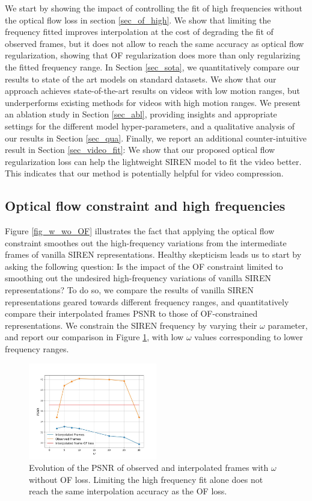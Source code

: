 \documentclass{article}
\begin{document}
We start by showing the impact of controlling the fit of high frequencies without the optical flow loss in section \ref{sec_of_high}.
We show that limiting the frequency fitted improves interpolation at the cost of degrading the fit of observed frames,
but it does not allow to reach the same accuracy as optical flow regularization,
showing that OF regularization does more than only regularizing the fitted frequency range.
In Section \ref{sec_sota}, we quantitatively compare our results to state of the art models on standard datasets.
We show that our approach achieves state-of-the-art results on videos with low motion ranges,
but underperforms existing methods for videos with high motion ranges.
We present an ablation study in Section \ref{sec_abl},
providing insights and appropriate settings for the different model hyper-parameters,
and a qualitative analysis of our results in Section \ref{sec_qua}.
Finally, we report an additional counter-intuitive result in Section \ref{sec_video_fit}:
We show that our proposed optical flow regularization loss can help the lightweight SIREN model to fit the video better.
This indicates that our method is potentially helpful for video compression.

\subsection{Optical flow constraint and high frequencies}

Figure \ref{fig_w_wo_OF} illustrates the fact that applying the optical flow constraint smoothes
out the high-frequency variations from the intermediate frames of vanilla SIREN representations.
Healthy skepticism leads us to start by asking the following question:
Is the impact of the OF constraint limited to smoothing out the undesired high-frequency variations of vanilla SIREN representations?
To do so, we compare the results of vanilla SIREN representations geared towards different frequency ranges,
and quantitatively compare their interpolated frames PSNR to those of OF-constrained representations.
We constrain the SIREN frequency by varying their $\omega$ parameter, and report our comparison in Figure \ref{fig_omega},
with low $\omega$ values corresponding to lower frequency ranges.

\begin{figure}[t]
\centering
\includegraphics[width=0.5\textwidth]{"omega_wo_of"}
\caption{Evolution of the PSNR of observed and interpolated frames with $\omega$ without OF loss.
Limiting the high frequency fit alone does not reach the same interpolation accuracy as the OF loss.}
\label{fig_omega}
\end{figure}
\end{document}
